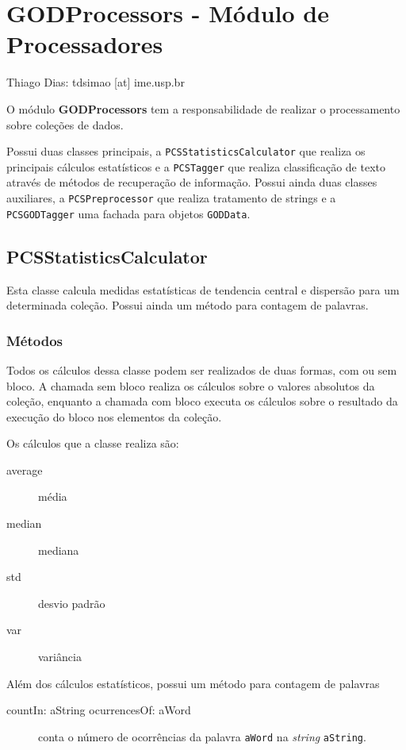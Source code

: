 

\section{GODProcessors - Módulo de Processadores}
\begin{center}
Thiago Dias: tdsimao [at] ime.usp.br
\end{center}


O módulo \textbf{GODProcessors} tem a responsabilidade de realizar o processamento sobre
coleções de dados.

Possui duas classes principais, a \texttt{PCSStatisticsCalculator} que realiza os principais
cálculos estatísticos e a \texttt{PCSTagger} que realiza classificação de texto através de
métodos de recuperação de informação. Possui ainda duas classes auxiliares, a
\texttt{PCSPreprocessor} que realiza tratamento de strings e a \texttt{PCSGODTagger} uma fachada
para objetos \texttt{GODData}.

\subsection{PCSStatisticsCalculator} 

Esta classe calcula medidas estatísticas de tendencia central e dispersão para um determinada
coleção. Possui ainda um método para contagem de palavras.


\subsubsection{Métodos}
Todos os cálculos dessa classe podem ser realizados de duas formas, com ou sem bloco. A chamada
sem bloco realiza os cálculos sobre o valores absolutos da coleção, enquanto a chamada com
bloco executa os cálculos sobre o resultado da execução do bloco nos elementos da coleção.

Os cálculos que a classe realiza são:
\begin{description}
    \item[average]  média 
    \item[median] mediana
    \item[std] desvio padrão
    \item[var] variância
\end{description}

Além dos cálculos estatísticos, possui um método para contagem de palavras

\begin{description}
    \item[countIn: aString ocurrencesOf: aWord] conta o número de ocorrências da palavra
                   \texttt{aWord} na \textit{string} \texttt{aString}.
\end{description}

